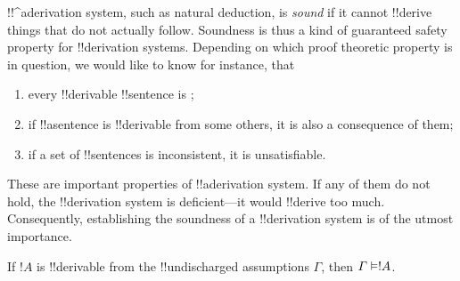 \documentclass[../../../include/open-logic-section]{subfiles}
\begin{document}
      {}
      {}
      

\begin{explain}
!!^a{derivation} system, such as natural deduction, is \emph{sound}
if it cannot !!{derive} things that do not actually follow.  Soundness is
thus a kind of guaranteed safety property for !!{derivation} systems.
Depending on which proof theoretic property is in question, we would
like to know for instance, that
\begin{enumerate}
\item every !!{derivable} !!{sentence} is ;
\item if !!a{sentence} is !!{derivable} from some others, it is also a
  consequence of them;
\item if a set of !!{sentence}s is inconsistent, it is unsatisfiable.
\end{enumerate}
These are important properties of !!a{derivation} system. If any of
them do not hold, the !!{derivation} system is deficient---it would
!!{derive} too much.  Consequently, establishing the soundness of a
!!{derivation} system is of the utmost importance.
\end{explain}

\begin{thm}[Soundness]
If $!A$ is !!{derivable} from the !!{undischarged} assumptions
$\Gamma$, then $\Gamma \Entails !A$.
\end{thm}
\end{document}
